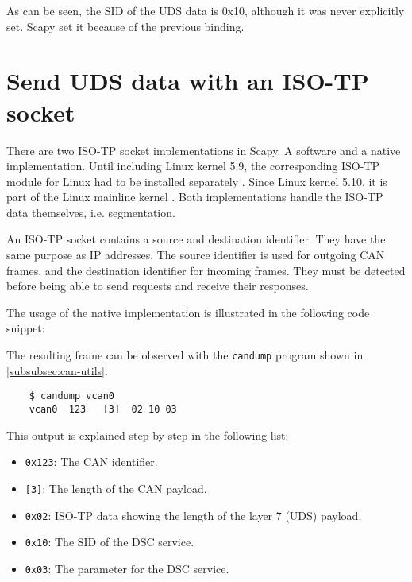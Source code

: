 As can be seen, the SID of the UDS data is 0x10, although it was never explicitly set. Scapy set it because of the previous binding.


\section{Send UDS data with an ISO-TP socket}

There are two ISO-TP socket implementations in Scapy. A software and a native implementation. Until including Linux kernel 5.9, the corresponding ISO-TP module for Linux had to be installed separately \cite{isotp-module}. Since Linux kernel 5.10, it is part of the Linux mainline kernel \cite{isotp-commit}. Both implementations handle the ISO-TP data themselves, i.e. segmentation.

An ISO-TP socket contains a source and destination identifier. They have the same purpose as IP addresses. The source identifier is used for outgoing CAN frames, and the destination identifier for incoming frames. They must be detected before being able to send requests and receive their responses.

The usage of the native implementation is illustrated in the following code snippet:


The resulting frame can be observed with the \texttt{candump} program shown in \autoref{subsubsec:can-utils}.

\begin{samepage}
\begin{verbatim}
    $ candump vcan0
    vcan0  123   [3]  02 10 03
\end{verbatim}
\end{samepage}

This output is explained step by step in the following list:

\begin{itemize}
    \item \texttt{0x123}: The CAN identifier.
    \item \texttt{[3]}: The length of the CAN payload.
    \item \texttt{0x02}: ISO-TP data showing the length of the layer 7 (UDS) payload.
    \item \texttt{0x10}: The SID of the DSC service.
    \item \texttt{0x03}: The parameter for the DSC service.
\end{itemize}

